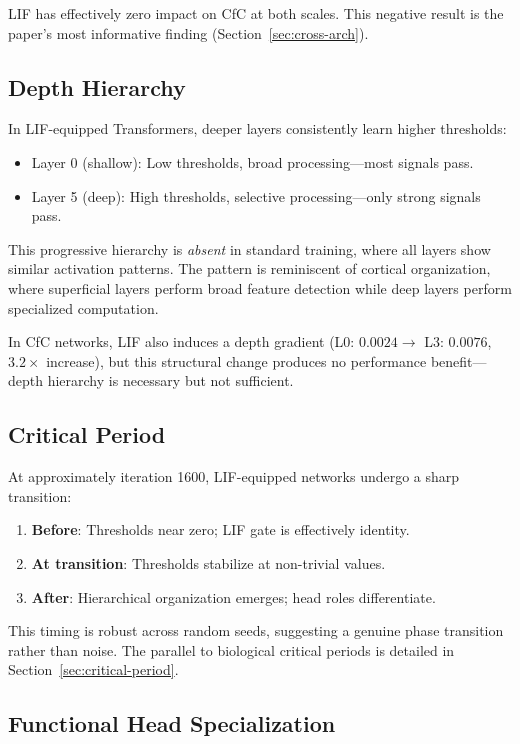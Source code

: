 \documentclass[11pt]{article}
\begin{document}
LIF has effectively zero impact on CfC at both scales. This negative result is the paper's most informative finding (Section~\ref{sec:cross-arch}).

\subsection{Depth Hierarchy}

In LIF-equipped Transformers, deeper layers consistently learn higher thresholds:
\begin{itemize}
    \item Layer 0 (shallow): Low thresholds, broad processing---most signals pass.
    \item Layer 5 (deep): High thresholds, selective processing---only strong signals pass.
\end{itemize}

This progressive hierarchy is \emph{absent} in standard training, where all layers show similar activation patterns. The pattern is reminiscent of cortical organization, where superficial layers perform broad feature detection while deep layers perform specialized computation.

In CfC networks, LIF also induces a depth gradient (L0: $0.0024 \to$ L3: $0.0076$, $3.2\times$ increase), but this structural change produces no performance benefit---depth hierarchy is necessary but not sufficient.

\subsection{Critical Period}

At approximately iteration 1600, LIF-equipped networks undergo a sharp transition:
\begin{enumerate}
    \item \textbf{Before}: Thresholds near zero; LIF gate is effectively identity.
    \item \textbf{At transition}: Thresholds stabilize at non-trivial values.
    \item \textbf{After}: Hierarchical organization emerges; head roles differentiate.
\end{enumerate}

This timing is robust across random seeds, suggesting a genuine phase transition rather than noise. The parallel to biological critical periods \cite{hensch2005critical} is detailed in Section~\ref{sec:critical-period}.

\subsection{Functional Head Specialization}
\end{document}
